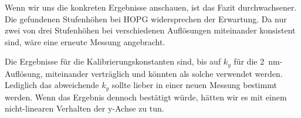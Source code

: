Wenn wir uns die konkreten Ergebnisse anschauen, ist das Fazit durchwachsener. Die gefundenen Stufenhöhen bei HOPG widersprechen der Erwartung. Da nur zwei von drei Stufenhöhen bei verschiedenen Auflösungen miteinander konsistent sind, wäre eine erneute Messung angebracht.

Die Ergebnisse für die Kalibrierungskonstanten sind, bis auf $k_y$ für die \SI{2}{nm}-Auflösung, miteinander verträglich und könnten als solche verwendet werden. Lediglich das abweichende $k_y$ sollte lieber in einer neuen Messung bestimmt werden. Wenn das Ergebnis dennoch bestätigt würde, hätten wir es mit einem nicht-linearen Verhalten der y-Achse zu tun.



